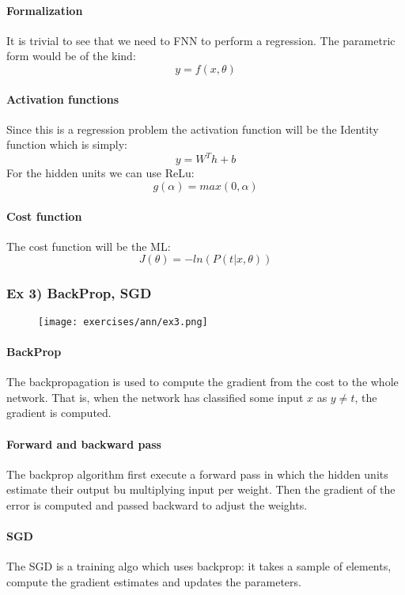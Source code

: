 \paragraph{Formalization}
It is trivial to see that we need to FNN to perform a regression. The parametric form would be of the kind:
$$y=f(x,\theta)$$

\paragraph{Activation functions}
Since this is a regression problem the activation function will be the Identity function which is simply:
$$y=W^Th+b$$
For the hidden units we can use ReLu:
$$g(\alpha)=max(0,\alpha)$$

\paragraph{Cost function }
The cost function will be the ML:
$$J(\theta)=-ln(P(t|x,\theta))$$

\subsubsection{Ex 3) BackProp, SGD}

\begin{figure}[H]
    \centering
    \texttt{[image: exercises/ann/ex3.png]}
\end{figure}

\paragraph{BackProp}
The backpropagation is used to compute the gradient from the cost to the whole network. That is, when the network has  classified some input $x$ as $y\neq t$, the gradient is computed.

\paragraph{Forward and backward pass}
The backprop algorithm first execute a forward pass in which the hidden units estimate their output bu multiplying input per weight. Then the gradient of the error is computed and passed backward to adjust the weights.

\paragraph{SGD}
The SGD is a training algo which uses backprop: it takes a sample of elements, compute the gradient estimates and updates the parameters.

